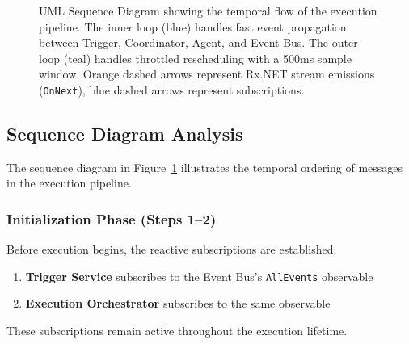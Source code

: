 \begin{figure}[htbp]

\caption{UML Sequence Diagram showing the temporal flow of the execution pipeline.
The inner loop (blue) handles fast event propagation between Trigger, Coordinator, Agent, and Event Bus.
The outer loop (teal) handles throttled rescheduling with a 500ms sample window.
Orange dashed arrows represent Rx.NET stream emissions (\texttt{OnNext}), blue dashed arrows represent subscriptions.}
\label{fig:execution-sequence}
\end{figure}


\subsection{Sequence Diagram Analysis}

The sequence diagram in Figure~\ref{fig:execution-sequence} illustrates the temporal ordering of messages in the execution pipeline.

\subsubsection{Initialization Phase (Steps 1--2)}
Before execution begins, the reactive subscriptions are established:
\begin{enumerate}
    \item \textbf{Trigger Service} subscribes to the Event Bus's \texttt{AllEvents} observable
    \item \textbf{Execution Orchestrator} subscribes to the same observable
\end{enumerate}
These subscriptions remain active throughout the execution lifetime.

